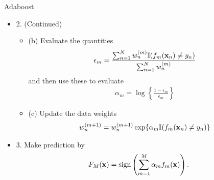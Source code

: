 \documentclass{beamer}
\def\bfx{{\bf x}}
\begin{document}
                     \begin{frame}{Adaboost}%
                      \begin{itemize}
                      \item 2. (Continued)
                      \begin{itemize}
                        \item (b) Evaluate the quantities
                       \begin{align}\label{Em}
                       \epsilon_m = \frac{\sum^N_{n=1} w_n^{(m)}\mathbb{I}(f_m(\bfx_n)\ne y_n)}{\sum^N_{n=1} w_n^{(m)}}
                       \end{align}
                       and then use these to evaluate 
                       \begin{align}\label{alpham}
                       \alpha_m = \log \left\{\frac{1-\epsilon_m}{\epsilon_m} \right\}
                       \end{align}
                       \item (c) Update the data weights
                       \begin{align}\label{wn}
                       w_n^{(m+1)} = w_n^{(m+1)} \exp\{\alpha_m \mathbb{I}(f_m(\bfx_n)\ne y_n) \}
                       \end{align}
                      \end{itemize}                     
                      \item 3. Make prediction by 
                      \begin{align}\label{Ym}
                      F_M(\bfx)=\mathrm{sign}\left( \sum^M_{m=1} \alpha_m f_m(\bfx) \right).
                      \end{align}
                      \end{itemize}

                     \end{frame}
\end{document}
